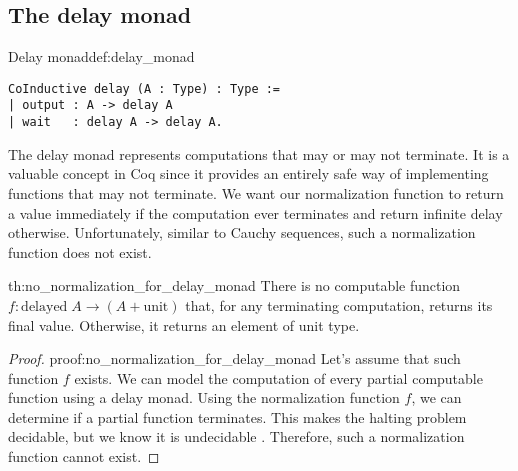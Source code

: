 \subsection{The delay monad}
\begin{defi}{Delay monad}{def:delay_monad}
\begin{verbatim}
CoInductive delay (A : Type) : Type := 
| output : A -> delay A
| wait   : delay A -> delay A.
\end{verbatim}
\end{defi}
The delay monad \cite{DelayedMonad} represents computations that may or may not terminate. It is a valuable concept in Coq since it provides an entirely safe way of implementing functions that may not terminate. We want our normalization function to return a value immediately if the computation ever terminates and return infinite delay otherwise. Unfortunately, similar to Cauchy sequences, such a normalization function does not exist.
\begin{theo}{}{th:no_normalization_for_delay_monad}
There is no computable function $f: \textrm{delayed} \; A \rightarrow (A + \textrm{unit})$ that, for any terminating computation, returns its final value. Otherwise, it returns an element of unit type.
\end{theo}
\begin{proof}{}{proof:no_normalization_for_delay_monad}
Let's assume that such function $f$ exists. We can model the computation of every partial computable function using a delay monad. Using the normalization function $f$, we can determine if a partial function terminates. This makes the halting problem decidable, but we know it is undecidable \cite{Undecidable}. Therefore, such a normalization function cannot exist. \contradiction
\end{proof}
